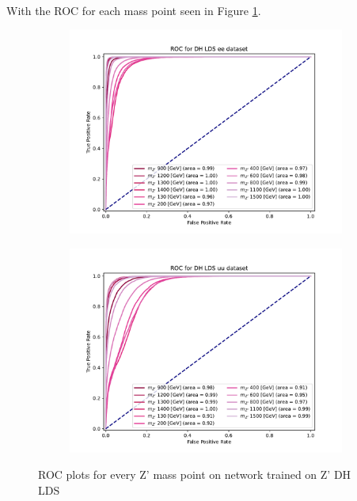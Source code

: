 \documentclass[14pt, a4paper]{book}
\begin{document}
\\With the ROC for each mass point seen in Figure \ref{fig:DH_LDS_ROCS}.
\begin{figure}[!ht]
	\centering
	\begin{subfigure}[b]{0.49\textwidth}
      \centering
      \includegraphics[width=1\textwidth]{XGBoost/DH_LDS/ROC_ee.pdf}
      \end{subfigure}
   \hfill
   \begin{subfigure}[b]{0.49\textwidth}
      \centering
      \includegraphics[width=1\textwidth]{XGBoost/DH_LDS/ROC_uu.pdf}
      \end{subfigure}
   \caption{ROC plots for every Z' mass point on network trained on Z' DH LDS}\label{fig:DH_LDS_ROCS}
\end{figure}
\end{document}
